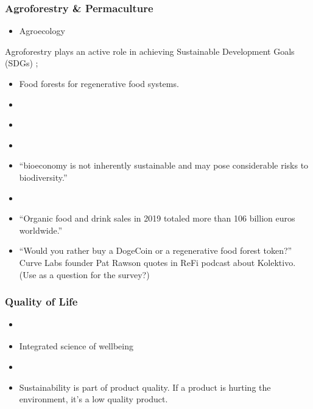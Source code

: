\documentclass[
  letterpaper,
  DIV=11,
  numbers=noendperiod]{scrartcl}
\providecommand{\tightlist}{%
  \setlength{\itemsep}{0pt}\setlength{\parskip}{0pt}}\usepackage{longtable,booktabs,array}
\begin{document}
\subsubsection{Agroforestry \&
Permaculture}\label{agroforestry-permaculture}

\begin{itemize}
\tightlist
\item
  Agroecology \citet{balticseaactiongroupEITFoodRegenerative2023}
\end{itemize}

Agroforestry plays an active role in achieving Sustainable Development
Goals (SDGs) \citep{rubaPotentialityHomesteadAgroforestry2023};

\begin{itemize}
\item
  Food forests for regenerative food systems.
\item
  \citet{irwinIncreasingTreeCover2023}
\item
  \citet{yadavExploringInnovationSustainable2023}
\item
  \citet{lowMixedFarmingAgroforestry2023}
\item
  \citet{ollinahoSeparatingTwoFaces2023} ``bioeconomy is not inherently
  sustainable and may pose considerable risks to biodiversity.''
\item
  \citet{dequeiroz-steinPossibilitiesMainstreamingBiodiversity2023}
\item
  \citet{gamageRoleOrganicFarming2023} ``Organic food and drink sales in
  2019 totaled more than 106 billion euros worldwide.''
\item
  ``Would you rather buy a DogeCoin or a regenerative food forest
  token?'' Curve Labs founder Pat Rawson quotes
  \citet{shillerNarrativeEconomicsHow2019} in ReFi podcast about
  Kolektivo. \citet{refidaoReFiPodcastS2E92022} (Use as a question for
  the survey?)
\end{itemize}

\subsubsection{Quality of Life}\label{quality-of-life}

\begin{itemize}
\item
  \citet{kaklauskasSynergyClimateChange2023}
\item
  \citet{riegerIntegratedScienceWellbeing2023} Integrated science of
  wellbeing
\item
  \citet{fabrisCLIMATECHANGEQUALITY2022}
\item
  Sustainability is part of product quality. If a product is hurting the
  environment, it's a low quality product.
\end{itemize}
\end{document}
